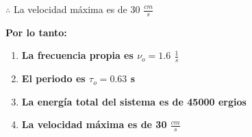 $\therefore$ La velocidad máxima es de 30 $\frac{cm}{s}$

\vspace*{0.5cm}

\textbf{Por lo tanto:}

\begin{enumerate}
    \item \textbf{La frecuencia propia es  $ \nu_{o} = 1.6 $ $\frac{1}{s}$}
    \item \textbf{El periodo es  $ \tau_{o} = 0.63 $ s}
    \item \textbf{La energía total del sistema es de 45000 ergios}
    \item \textbf{La velocidad máxima es de 30 $\frac{cm}{s}$}
\end{enumerate}